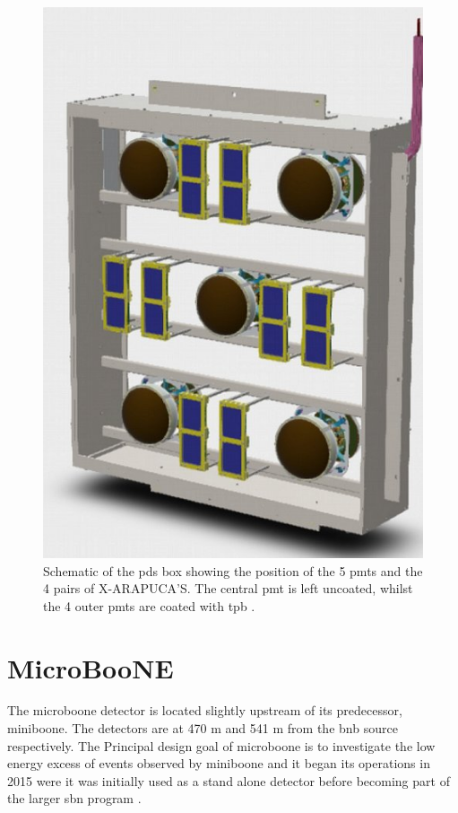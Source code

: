 \begin{figure}[!h]
    \centering
    \includegraphics[width = \largefigwidth]{figures-chap3/PDS_box.jpg}
    \caption[Schematic of PDS box.]{Schematic of the \gls{pds} box showing the position of the 5 \glspl{pmt} and the 4 pairs of X-ARAPUCA'S. The central \gls{pmt} is left uncoated, whilst the 4 outer \glspl{pmt} are coated with \gls{tpb} \cite{LArTPC_review}.}
    \label{fig:pds_box}
\end{figure}

\section{MicroBooNE}\label{sec:MicroBooNE}

The \gls{microboone} detector is located slightly upstream of its predecessor, \gls{miniboone}. The detectors are at 470 m and 541 m from the \gls{bnb} source respectively. The Principal design goal of \gls{microboone} is to investigate the low energy excess of events observed by \gls{miniboone} and it began its operations in 2015 were it was initially used as a stand alone detector before becoming part of the larger \gls{sbn} program \cite{microboone_detector}.


